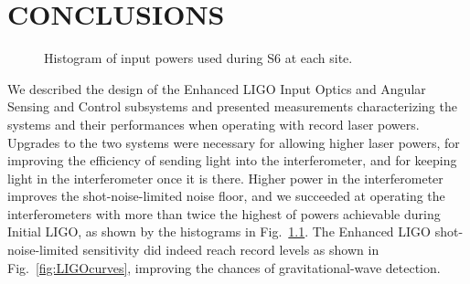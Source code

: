 \chapter{CONCLUSIONS}

\begin{figure}
\begin{centering}
\caption[Histogram of input powers used during S6]{Histogram of input
  powers used during S6 at each site.}
\label{fig:S6pwrs}
\end{centering}
\end{figure}

We described the design of the Enhanced LIGO Input Optics and Angular
Sensing and Control subsystems and presented measurements
characterizing the systems and their performances when operating with
record laser powers. Upgrades to the two systems were necessary for
allowing higher laser powers, for improving the efficiency of sending
light into the interferometer, and for keeping light in the
interferometer once it is there. Higher power in the interferometer
improves the shot-noise-limited noise floor, and we succeeded at
operating the interferometers with more than twice the highest of
powers achievable during Initial LIGO, as shown by the histograms in
Fig.~\ref{fig:S6pwrs}. The Enhanced LIGO shot-noise-limited
sensitivity did indeed reach record levels as shown in
Fig.~\ref{fig:LIGOcurves}, improving the chances of gravitational-wave
detection.

